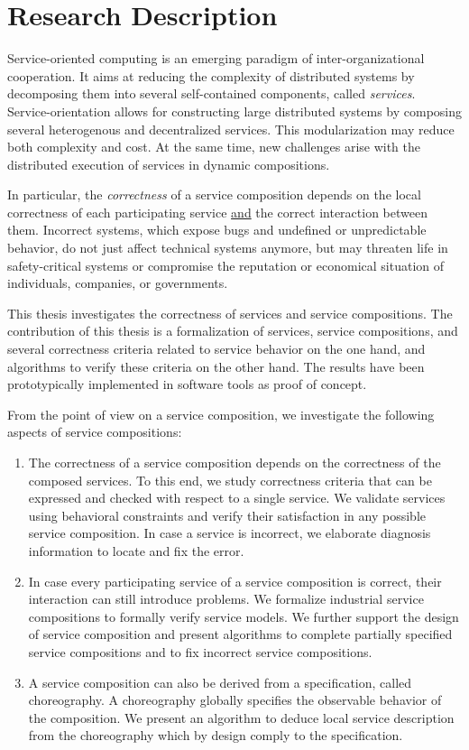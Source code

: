 \documentclass[a4paper]{article}
\begin{document}
\pagestyle{empty}
\section*{Research Description}

Service-oriented computing is an emerging paradigm of inter-organizational cooperation. It aims at reducing the complexity of distributed systems by decomposing them into several self-contained components, called \emph{services}. Service-orientation allows for constructing large distributed systems by composing several heterogenous and decentralized services. This modularization may reduce both complexity and cost. At the same time, new challenges arise with the distributed execution of services in dynamic compositions.

In particular, the \emph{correctness} of a service composition depends on the local correctness of each participating service \underline{and} the correct interaction between them. Incorrect systems, which expose bugs and undefined or unpredictable behavior, do not just affect technical systems anymore, but may threaten life in safety-critical systems or compromise the reputation or economical situation of individuals, companies, or governments.

This thesis investigates the correctness of services and service compositions. The contribution of this thesis is a formalization of services, service compositions, and several correctness criteria related to service behavior on the one hand, and algorithms to verify these criteria on the other hand. The results have been prototypically implemented in software tools as proof of concept.

From the point of view on a service composition, we investigate the following aspects of service compositions:

\begin{enumerate}
\item The correctness of a service composition depends on the correctness of the composed services. To this end, we study correctness criteria that can be expressed and checked with respect to a single service. We validate services using behavioral constraints and verify their satisfaction in any possible service composition. In case a service is incorrect, we elaborate diagnosis information to locate and fix the error.

\item In case every participating service of a service composition is correct, their interaction can still introduce problems. We formalize industrial service compositions to formally verify service models. We further support the design of service composition and present algorithms to complete partially specified service compositions and to fix incorrect service compositions.

\item A service composition can also be derived from a specification, called choreography. A choreography globally specifies the observable behavior of the composition. We present an algorithm to deduce local service description from the choreography which by design comply to the specification.
\end{enumerate}
\end{document}
